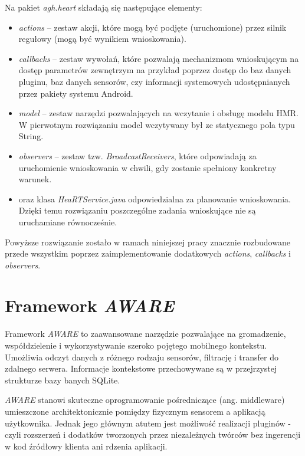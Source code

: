 Na pakiet \textit{agh.heart} składają się następujące elementy:
\begin{itemize}
	\item \textit{actions} -- zestaw akcji, które mogą być podjęte (uruchomione) przez silnik regułowy (mogą być wynikiem wnioskowania).
	
	\item \textit{callbacks} -- zestaw wywołań, które pozwalają mechanizmom wnioskującym na dostęp parametrów zewnętrzym na przykład poprzez dostęp do baz danych pluginu, baz danych sensorów, czy informacji systemowych udostępnianych przez pakiety systemu Android.
	
	\item \textit{model} -- zestaw narzędzi pozwalających na wczytanie i obsługę modelu HMR. W pierwotnym rozwiązaniu model wczytywany był ze statycznego pola typu String.
	
	\item \textit{observers} -- zestaw tzw. \textit{BroadcastReceivers}, które odpowiadają za uruchomienie wnioskowania w chwili, gdy zostanie spełniony konkretny warunek.
	
	\item oraz klasa \textit{HeaRTService.java} odpowiedzialna za planowanie wnioskowania. Dzięki temu rozwiązaniu poszczególne zadania wnioskujące nie są uruchamiane równocześnie\cite{heartaware}.
\end{itemize}

Powyższe rozwiązanie zostało w ramach niniejszej pracy znacznie rozbudowane przede wszystkim poprzez zaimplementowanie dodatkowych \textit{actions}, \textit{callbacks} i \textit{observers}.


\section{Framework \textit{AWARE}}
\label{sec:frameworkAware}

Framework \textit{AWARE} to zaawansowane narzędzie pozwalające na gromadzenie, współdzielenie i wykorzystywanie szeroko pojętego mobilnego kontekstu. Umożliwia odczyt danych z różnego rodzaju sensorów, filtrację i transfer do zdalnego serwera. Informacje kontekstowe przechowywane są w przejrzystej strukturze bazy banych SQLite. 

\textit{AWARE} stanowi skuteczne oprogramowanie pośredniczące (ang. middleware) umieszczone architektonicznie pomiędzy fizycznym sensorem a aplikacją użytkownika. Jednak jego głównym atutem jest możliwość realizacji pluginów - czyli rozszerzeń i dodatków tworzonych przez niezależnych twórców bez ingerencji w kod źródłowy klienta ani rdzenia aplikacji\cite{AwareFramework}. 


